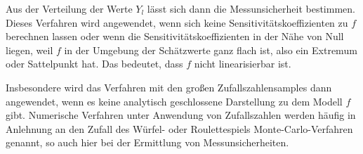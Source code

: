 Aus der Verteilung der Werte $Y_l$ lässt sich dann die Messunsicherheit bestimmen.
Dieses Verfahren wird angewendet, wenn sich keine Sensitivitätskoeffizienten zu $f$
berechnen lassen oder wenn die Sensitivitätskoeffizienten in der Nähe von Null liegen, weil
$f$ in der Umgebung der Schätzwerte ganz flach ist, also ein Extremum oder Sattelpunkt hat.
Das bedeutet, dass $f$ nicht linearisierbar ist.

Insbesondere wird das Verfahren mit den großen Zufallszahlensamples dann angewendet, wenn es
keine analytisch geschlossene Darstellung zu dem Modell $f$ gibt.
Numerische Verfahren unter Anwendung von Zufallszahlen werden häufig in Anlehnung an den Zufall
des Würfel- oder Roulettespiels Monte-Carlo-Verfahren genannt, so auch hier bei der Ermittlung
von Messunsicherheiten.
